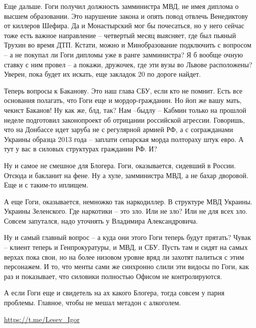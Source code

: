 Еще дальше. Гоги получил должность замминистра МВД, не имея диплома о высшем
образовании. Это нарушение закона и опять повод отвлечь Венедиктову от киллеров
Шефира. Да и Монастырский мог бы почесаться, но у него сейчас тоже есть важное
направление – четвертый месяц выясняет, где был пьяный Трухин во время ДТП.
Кстати, можно и Минобразование подключить с вопросом – а не покупал ли Гоги
дипломы уже в ранге замминистра? Я б вообще очную ставку с ним провел – а
покажи, дружочек, где эти вузы во Львове расположены? Уверен, пока будет их
искать, еще закладок 20 по дороге найдет.

Теперь вопросы к Баканову. Это наш глава СБУ, если кто не помнит. Есть все
основания полагать, что Гоги еще и мордор-гражданин. Но йоп же вашу мать,
чекист Баканов! Ну как же, блд, так? Нам –быдлу – Кабмин только на прошлой
неделе подготовил законопроект об отрицании российской агрессии. Говоришь, что
на Донбассе идет заруба не с регулярной армией РФ, а с согражданами Украины
образца 2013 года – заплати сепарская морда полтораху штук евро. А тут у вас в
силовых структурах гражданин РФ. И?

Ну и самое не смешное для Блогера. Гоги, оказывается, сидевший в России. Отсюда
и бакланит на фене. Ну а хуле, замминистра МВД, а не бахар дворовой. Еще и с
таким-то иплищем.

А еще Гоги, оказывается, немножко так наркодиллер. В структуре МВД Украины.
Украины Зеленского. Где наркотики – это зло. Или не зло? Или не для всех зло.
Совсем запутался, надо уточнять у Владимира Александровича.

Ну и самый главный вопрос – а куда они этого Гоги теперь будут прятать? Чувак –
клиент теперь и Генпрокуратуры, и МВД, и СБУ. Пусть там и сидят на самых верхах
пока свои, но на более низовом уровне вряд ли захотят палиться с этим
персонажем. И то, что менты сами же синхронно слили эти видосы по Гоги, как раз
и показывает, что силовики полностью Офисом не контролируются.

А если Гоги еще и свидетель на ах какого Блогера, тогда совсем у парня
проблемы. Главное, чтобы не мешал метадон с алкоголем.

\url{https://t.me/Lesev_Igor}

